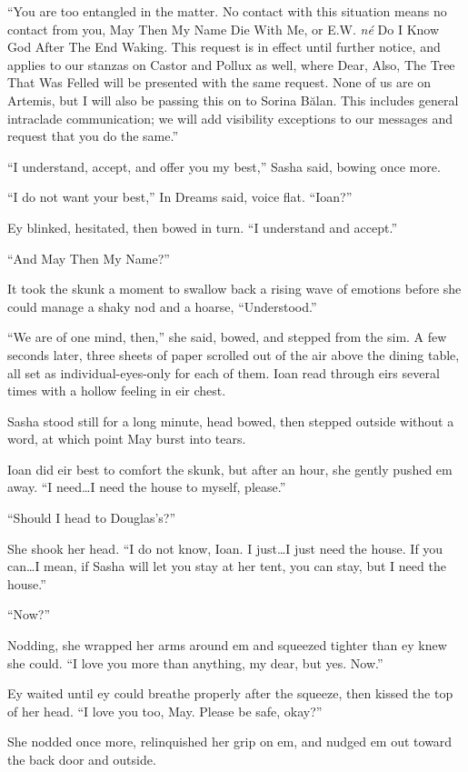 ``You are too entangled in the matter. No contact with this situation means no contact from you, May Then My Name Die With Me, or E.W. \emph{né} Do I Know God After The End Waking. This request is in effect until further notice, and applies to our stanzas on Castor and Pollux as well, where Dear, Also, The Tree That Was Felled will be presented with the same request. None of us are on Artemis, but I will also be passing this on to Sorina Bălan. This includes general intraclade communication; we will add visibility exceptions to our messages and request that you do the same.''

``I understand, accept, and offer you my best,'' Sasha said, bowing once more.

``I do not want your best,'' In Dreams said, voice flat. ``Ioan?''

Ey blinked, hesitated, then bowed in turn. ``I understand and accept.''

``And May Then My Name?''

It took the skunk a moment to swallow back a rising wave of emotions before she could manage a shaky nod and a hoarse, ``Understood.''

``We are of one mind, then,'' she said, bowed, and stepped from the sim. A few seconds later, three sheets of paper scrolled out of the air above the dining table, all set as individual-eyes-only for each of them. Ioan read through eirs several times with a hollow feeling in eir chest.

Sasha stood still for a long minute, head bowed, then stepped outside without a word, at which point May burst into tears.

Ioan did eir best to comfort the skunk, but after an hour, she gently pushed em away. ``I need\ldots I need the house to myself, please.''

``Should I head to Douglas's?''

She shook her head. ``I do not know, Ioan. I just\ldots I just need the house. If you can\ldots I mean, if Sasha will let you stay at her tent, you can stay, but I need the house.''

``Now?''

Nodding, she wrapped her arms around em and squeezed tighter than ey knew she could. ``I love you more than anything, my dear, but yes. Now.''

Ey waited until ey could breathe properly after the squeeze, then kissed the top of her head. ``I love you too, May. Please be safe, okay?''

She nodded once more, relinquished her grip on em, and nudged em out toward the back door and outside.

